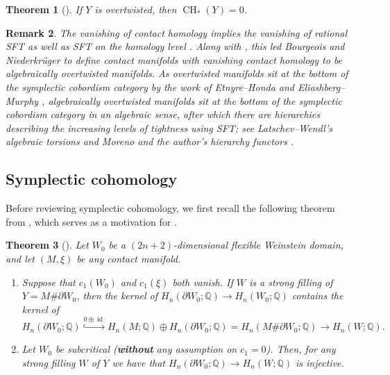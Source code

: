 \documentclass[reqno,11pt]{amsart}
\numberwithin{equation}{section}
\newtheorem{theorem}{\textbf{Theorem}}[section]
\newtheorem{remark}[theorem]{\textbf{Remark}}
\def\Q{{\mathbb Q}}
\DeclareMathOperator{\Id}{id}
\DeclareMathOperator{\CHA}{CH}
\begin{document}
\begin{theorem}[\cite{zbMATH05709738}]\label{thm:AO}
    If $Y$ is overtwisted, then $\CHA_*(Y)=0$.
\end{theorem}

\begin{remark}
    The vanishing of contact homology implies the vanishing of rational SFT as well as SFT on the homology level \cite{zbMATH05658836}. Along with , this led Bourgeois and Niederkr{\"u}ger to define contact manifolds with vanishing contact homology to be algebraically overtwisted manifolds. As overtwisted manifolds sit at the bottom of the symplectic cobordism category by the work of Etnyre--Honda \cite{zbMATH01801587} and Eliashberg--Murphy \cite{zbMATH07600533}, algebraically overtwisted manifolds sit at the bottom of the symplectic cobordism category in an algebraic sense, after which there are hierarchies describing the increasing levels of tightness using SFT; see Latschev--Wendl's algebraic torsions \cite{zbMATH06000009} and Moreno and the author's hierarchy functors \cite{moreno2020landscape}.
\end{remark}

\subsection{Symplectic cohomology}
Before reviewing symplectic cohomology, we first recall the following theorem from \cite{bowden2022making}, which serves as a motivation for .
\begin{theorem}[{\cite[Theorem 4.1]{bowden2022making}}]\label{thm:flex}
Let $W_0$ be a $(2n+2)$-dimensional flexible Weinstein domain, and let $(M,\xi)$ be any contact manifold.
    \begin{enumerate}
        \item[(a)]  Suppose that $c_1(W_0)$ and $c_1(\xi)$ both vanish. If $W$ is a strong filling of $Y=M\# \partial W_0$, then the kernel of $H_n(\partial W_0;\Q)\to H_n(W_0;\Q)$ contains the kernel of $$H_n(\partial W_0;\Q) \stackrel{0\oplus \Id }{\hookrightarrow}  H_n(M;\Q) \oplus H_n(\partial W_0;\Q)=H_n(M\# \partial W_0;\Q)\rightarrow H_n(W;\Q).$$ 
        \item[(b)] Let $W_0$ be subcritical (\textbf{without} any assumption on $c_1=0$). Then, for any strong filling $W$ of $Y$ we have that $H_n(\partial W_0;\Q)\to H_n(W;\Q)$ is injective.
        \end{enumerate}
\end{theorem}
\end{document}
